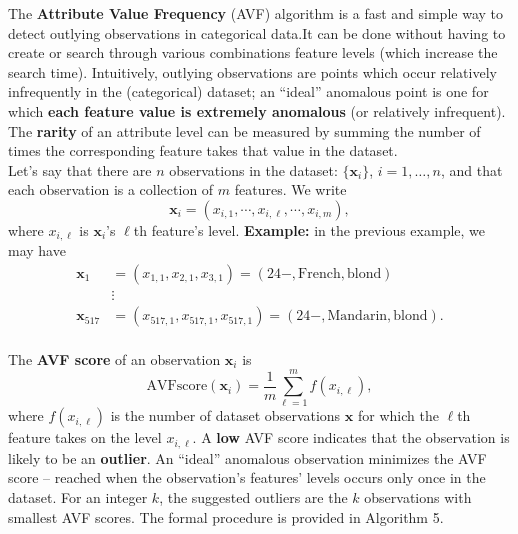 \documentclass[20pt,landscape,footrule,headrule]{foils}
\newcommand{\newl}{\newline\newline}
\def\fh{\foilhead}
\begin{document}
{{\fh{5.3.1 -- AVF Algorithm} \label{5.3.1} 
\noindent The \textbf{Attribute Value Frequency} (AVF) algorithm is a fast and simple way to detect outlying observations in categorical data.\newl It can be done without having to create or search through various combinations feature levels (which increase the search time).  \newline\newline Intuitively, outlying observations are points which occur relatively infrequently in the (categorical) dataset;  an ``ideal'' anomalous point is one for which  \textbf{each feature value is extremely anomalous} (or relatively infrequent). 
\newline\newline The \textbf{rarity} of an attribute level can be measured by summing the number of times the corresponding feature takes that value in the dataset. 
\newpage\ \\ \noindent Let's say that there are $n$ observations in the dataset: $\{\mathbf{x}_i\}$, $i = 1, \ldots, n$, and that each observation is a collection of $m$ features. \newl We write $$\mathbf{x}_{i} = (x_{i,1}, \cdots , x_{i,\ell}, \cdots, x_{i,m}),$$ where  $x_{i,\ell}$ is $\mathbf{x}_i$'s $\ell$th feature's level.\newl 
\textbf{Example:} in the previous example, we may have \begin{align*} \mathbf{x}_1&=(x_{1,1},x_{2,1},x_{3,1})=(24-,\text{French},\text{blond}) \\ &\vdots \\  \mathbf{x}_{517}&=(x_{517,1},x_{517,1},x_{517,1})=(24-,\text{Mandarin},\text{blond}).\end{align*}
\newpage\ \\ \noindent The \textbf{AVF score} of an observation $\textbf{x}_i$ is
$$\text{AVFscore}(\mathbf{x}_i) = \frac{1}{m} \sum_{\ell=1}^{m}f(x_{i,\ell}),$$
where $f(x_{i,\ell})$ is the number of dataset observations $\mathbf{x}$ for which the  $\ell$th feature takes on the level ${x}_{i,\ell}$. \newl A \textbf{low} AVF score indicates that the observation is  likely to be an \textbf{outlier}. 
\newline\newline An ``ideal'' anomalous observation minimizes the AVF score -- reached when the observation's features' levels occurs only once in the dataset.
\newl For an integer $k$, the suggested  outliers are the $k$ observations with smallest AVF scores. The formal procedure is provided in Algorithm 5.
\newpage
}}
\end{document}
